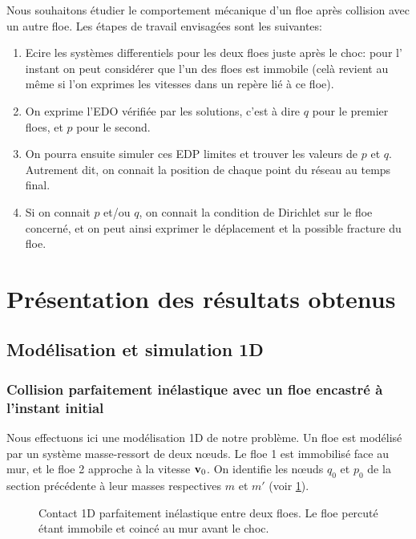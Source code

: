 Nous souhaitons étudier le comportement mécanique d'un floe après collision avec un autre floe. Les étapes de travail envisagées sont les suivantes:
\begin{enumerate}
    \item Ecire les systèmes differentiels pour les deux floes juste après le choc: pour l' instant on peut considérer que l'un des floes est immobile (celà revient au même si l'on exprimes les vitesses dans un repère lié à ce floe).
    \item On exprime l'EDO vérifiée par les solutions, c'est à dire $q$ pour le premier floes, et $p$ pour le second.
    \item On pourra ensuite simuler ces EDP limites et trouver les valeurs de $p$ et $q$. Autrement dit, on connait la position de chaque point du réseau au temps final.
    \item Si on connait $p$ et/ou $q$, on connait la condition de Dirichlet sur le floe concerné, et on peut ainsi exprimer le déplacement et la possible fracture du floe. 
\end{enumerate}







\section{Présentation des résultats obtenus}










\subsection{Modélisation et simulation 1D}










\subsubsection{Collision parfaitement inélastique avec un floe encastré à l'instant initial}

Nous effectuons ici une modélisation 1D de notre problème. Un floe est modélisé par un système masse-ressort de deux nœuds. Le floe 1 est immobilisé face au mur, et le floe 2 approche à la vitesse $\bm{\mathrm{v}}_0$. On identifie les nœuds $q_0$ et $p_0$ de la section précédente à leur masses respectives $m$ et $m'$ (voir \cref{fig:contact1d}).
\begin{figure}[!h]
    \centering
    \caption{Contact 1D parfaitement inélastique entre deux floes. Le floe percuté étant immobile et coincé au mur avant le choc.}
    \label{fig:contact1d}
\end{figure}

